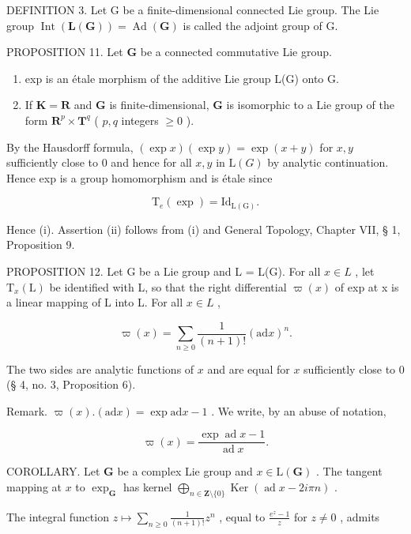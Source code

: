 DEFINITION 3. Let G be a finite-dimensional connected Lie group. The Lie group \(\operatorname{Int}(\mathbf{L}(\mathbf{G})) = \operatorname{Ad}(\mathbf{G})\) is called the adjoint group of G.

PROPOSITION 11. Let \(\mathbf{G}\) be a connected commutative Lie group.

\begin{enumerate}
\def\labelenumi{(\roman{enumi})}
\item
  exp is an étale morphism of the additive Lie group L(G) onto G.
\item
  If \(\mathbf{K} = \mathbf{R}\) and \(\mathbf{G}\) is finite-dimensional, \(\mathbf{G}\) is isomorphic to a Lie group of the form \(\mathbf{R}^p \times \mathbf{T}^q\) ( \(p, q\) integers \(\geqslant 0\) ).
\end{enumerate}

By the Hausdorff formula, \((\exp x)(\exp y) = \exp (x + y)\) for \(x,y\) sufficiently close to 0 and hence for all \(x,y\) in \(\mathrm{L}(G)\) by analytic continuation. Hence exp is a group homomorphism and is étale since

\[
\mathrm{T} _ {e} (\exp) = \mathrm{Id} _ {\mathrm{L(G)}}.
\]

Hence (i). Assertion (ii) follows from (i) and General Topology, Chapter VII, § 1, Proposition 9.

PROPOSITION 12. Let G be a Lie group and L = L(G). For all \(x \in L\) , let \(\mathrm{T}_{x}(\mathrm{L})\) be identified with L, so that the right differential \(\varpi(x)\) of exp at x is a linear mapping of L into L. For all \(x \in L\) ,

\[
\varpi (x) = \sum_ {n \geqslant 0} \frac {1}{(n + 1) !} (\mathrm{ad} x) ^ {n}.
\]

The two sides are analytic functions of \(x\) and are equal for \(x\) sufficiently close to 0 (§ 4, no. 3, Proposition 6).

Remark. \(\varpi(x) . (\mathrm{ad} x) = \exp \mathrm{ad} x - 1\) . We write, by an abuse of notation,

\[
\varpi (x) = \frac {\exp \operatorname{ad} x - 1}{\operatorname{ad} x}.
\]

COROLLARY. Let \(\mathbf{G}\) be a complex Lie group and \(x \in \mathrm{L}(\mathbf{G})\) . The tangent mapping at \(x\) to \(\exp_{\mathbf{G}}\) has kernel \(\bigoplus_{n \in \mathbf{Z}\setminus\{0\}} \operatorname{Ker}(\operatorname{ad} x - 2i\pi n)\) .

The integral function \(z \mapsto \sum_{n \geqslant 0} \frac{1}{(n + 1)!} z^n\) , equal to \(\frac{e^z - 1}{z}\) for \(z \neq 0\) , admits

